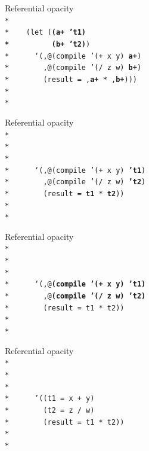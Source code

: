 \documentclass{beamer}
\begin{document}
\begin{frame}{Referential opacity}
  \texttt{
    \ \\*
    \ \\*
    \ \ \ (let (\textbf{(a+ 't1)\\*
      \ \ \ \ \ \ \ \ \  (b+ 't2)})\\*
    \ \ \ \ \ `(,@(compile '(+ x y) \textbf{a+})\\*
    \ \ \ \ \ \ \ ,@(compile '(/ z w) \textbf{b+})\\*
    \ \ \ \ \ \ \ (result = ,\textbf{a+} * ,\textbf{b+}))) \\*
    \ \\*
    \ 
  }
\end{frame}

\begin{frame}{Referential opacity}
  \texttt{
    \ \\*
    \ \\*
    \ \\*
    \ \\*
    \ \ \ \ \ `(,@(compile '(+ x y) \textbf{'t1})\\*
    \ \ \ \ \ \ \ ,@(compile '(/ z w) \textbf{'t2})\\*
    \ \ \ \ \ \ \ (result = \textbf{t1} * \textbf{t2})) \\*
    \ \\*
    \ 
  }
\end{frame}


\begin{frame}{Referential opacity}
  \texttt{
    \ \\*
    \ \\*
    \ \\*
    \ \\*
    \ \ \ \ \ `(,@\textbf{(compile '(+ x y) 't1)}\\*
    \ \ \ \ \ \ \ ,@\textbf{(compile '(/ z w) 't2)}\\*
    \ \ \ \ \ \ \ (result = t1 * t2)) \\*
    \ \\*
    \ 
  }
\end{frame}

\begin{frame}{Referential opacity}
  \texttt{
    \ \\*
    \ \\*
    \ \\*
    \ \\*
    \ \ \ \ \ '((t1 = x + y)\\*
    \ \ \ \ \ \ \ (t2 = z / w)\\*
    \ \ \ \ \ \ \ (result = t1 * t2)) \\*
    \ \\*
    \ 
  }
\end{frame}
\end{document}
